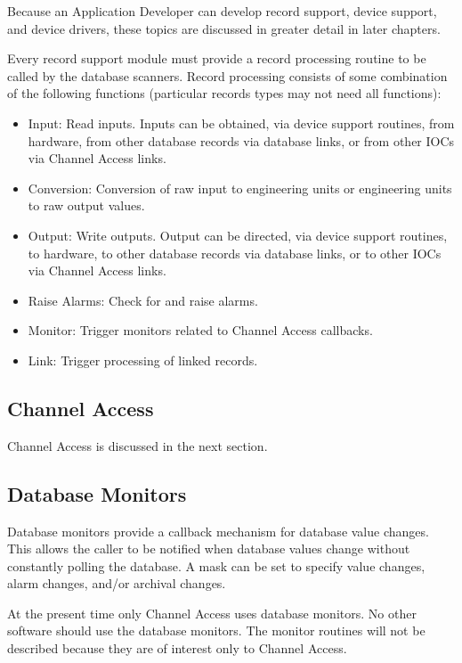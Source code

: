 Because an Application Developer can develop record support, device support, and device drivers, these topics are 
discussed in greater detail in later chapters.

Every record support module must provide a record processing routine to be called by the database scanners. Record 
processing consists of some combination of the following functions (particular records types may not need all functions):

\begin{itemize}\item Input:  Read inputs. Inputs can be obtained, via device support routines, from hardware, from other database 
records via database links, or from other IOCs via Channel Access links.

\item Conversion:  Conversion of raw input to engineering units or engineering units to raw output values.

\item Output:  Write outputs. Output can be directed, via device support routines, to hardware, to other database records 
via database links, or to other IOCs via Channel Access links.

\item Raise Alarms:  Check for and raise alarms.

\item Monitor:  Trigger monitors related to Channel Access callbacks.

\item Link:  Trigger processing of linked records.

\end{itemize}\subsection{Channel Access}

Channel Access is discussed in the next section.

\subsection{Database Monitors}

Database monitors  provide a callback mechanism for database value changes. This allows the caller to be notified when 
database values change without constantly polling the database. A mask can be set to specify value changes, alarm  
changes, and/or archival changes. 

At the present time only Channel Access uses database monitors. No other software should use the database monitors.  
The monitor routines will not be described because they are of interest only to Channel Access.

